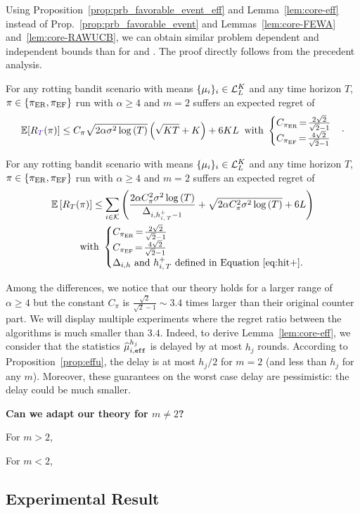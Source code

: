 Using Proposition~\ref{prop:prb_favorable_event_eff} and Lemma~\ref{lem:core-eff} instead of Prop.~\ref{prop:prb_favorable_event} and Lemmas~\ref{lem:core-FEWA} and~\ref{lem:core-RAWUCB}, we can obtain similar problem dependent and independent bounds than for \FEWA and \RUCB. The proof directly follows from the precedent analysis. 
\begin{theorem}
\label{th:rested-PI-eff}
For any rotting bandit scenario with means $\{\mu_i\}_{i} \in \mathcal{L}_L^K$ and any time horizon $T$, $\pi \in \left\{\normalfont \pi_{\rm ER}, \normalfont \pi_{\rm EF} \right\}$ run with $\alpha \geq 4$ and $m=2$ suffers an expected regret of
\begin{equation*}
\mathbb{E}[\regret(\pi)] \leq C_\pi\sqrt{2\alpha\sigma^2\log\pa{T}}\pa{\sqrt{KT} +K} + 6KL \;\; \text{with } 
\begin{cases}
C_{\piER} \!=\! \frac{2\sqrt{2}}{\sqrt{2}-1}\\
C_{\piEF} \!=\! \frac{4\sqrt{2}}{\sqrt{2}-1}
\end{cases}\!\cdot
\end{equation*}
\end{theorem}
\begin{theorem}\label{th:rested-PD-eff}
For any rotting bandit scenario with means $\{\mu_i\}_{i} \in \mathcal{L}_L^K$ and any time horizon $T$, $\pi \in \left\{\normalfont \pi_{\rm ER}, \normalfont \pi_{\rm EF} \right\}$ run with $\alpha \geq 4$ and $m=2$ suffers an expected regret of
\begin{align*}
\mathbb{E}\left[R_T(\pi)\right]  \leq \sum_{i\in \mathcal{K}} \left(\frac{2\alpha C_\pi^2\sigma^2\log\left(T\right)}{\Delta_{i,h_{i,\,T}^+-1}} + \sqrt{2\alpha C_\pi^2\sigma^2\log\left(T\right)} +6L \right) \\
\text{with } 
\begin{cases}
C_{\normalfont \pi_{\rm ER}} \!=\! \frac{2\sqrt{2}}{\sqrt{2}-1}\\
C_{\normalfont \pi_{\rm EF}} \!=\! \frac{4\sqrt{2}}{\sqrt{2}-1}\\
\text{$\Delta_{i,h}$ and $h_{i,\,T}^+$ defined in Equation~\ref{eq:hit+}.}
\end{cases}
\end{align*}
\end{theorem}

Among the differences, we notice that our theory holds for a larger range of $\alpha \geq 4$ but the constant $C_\pi$ is $\frac{\sqrt{2}}{\sqrt{2}-1} \sim 3.4$ times larger than their original counter part. We will display multiple experiments where the regret ratio between the algorithms is much smaller than $3.4$. Indeed, to derive Lemma~\ref{lem:core-eff}, we consider that the statistics $\widehat{\mu}_{i,\texttt{eff}}^{h_j}$ is delayed by at most $h_j$ rounds. According to Proposition~\ref{prop:effu}, the delay is at most $h_j/2$ for $m=2$ (and less than $h_j$ for any $m$). Moreover, these guarantees on the worst case delay are pessimistic: the delay could be much smaller. 

\begin{remark}
\textbf{Can we adapt our theory for {$m\neq2$}?} 

For $m>2$, 

For $m<2$,

\end{remark}

\subsection{Experimental Result}





